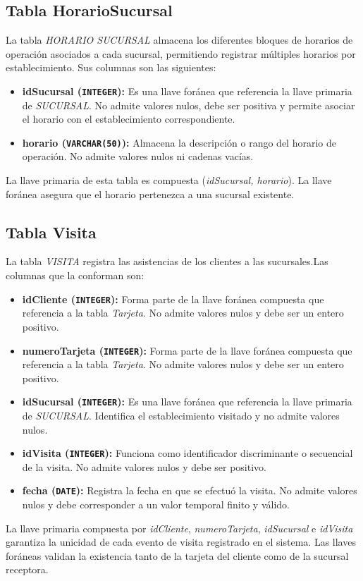 \subsection{Tabla HorarioSucursal} La tabla \textit{HORARIO SUCURSAL} almacena los diferentes bloques de horarios de operación asociados a cada sucursal, permitiendo registrar múltiples horarios por establecimiento. Sus columnas son las siguientes:
\begin{itemize}
    \item \textbf{idSucursal (\texttt{INTEGER}):} Es una llave foránea que referencia la llave primaria de \textit{SUCURSAL}. No admite valores nulos, debe ser positiva y permite asociar el horario con el establecimiento correspondiente.
    \item \textbf{horario (\texttt{VARCHAR(50)}):} Almacena la descripción o rango del horario de operación. No admite valores nulos ni cadenas vacías.
\end{itemize}
La llave primaria de esta tabla es compuesta (\textit{idSucursal, horario}). La llave foránea asegura que el horario pertenezca a una sucursal existente.

\subsection{Tabla Visita}La tabla \textit{VISITA} registra las asistencias de los clientes a las sucursales.Las columnas que la conforman son:
\begin{itemize}
    \item \textbf{idCliente (\texttt{INTEGER}):} Forma parte de la llave foránea compuesta que referencia a la tabla \textit{Tarjeta}. No admite valores nulos y debe ser un entero positivo.
    \item \textbf{numeroTarjeta (\texttt{INTEGER}):} Forma parte de la llave foránea compuesta que referencia a la tabla \textit{Tarjeta}. No admite valores nulos y debe ser un entero positivo.
    \item \textbf{idSucursal (\texttt{INTEGER}):} Es una llave foránea que referencia la llave primaria de \textit{SUCURSAL}. Identifica el establecimiento visitado y no admite valores nulos.
    \item \textbf{idVisita (\texttt{INTEGER}):} Funciona como identificador discriminante o secuencial de la visita. No admite valores nulos y debe ser positivo.
    \item \textbf{fecha (\texttt{DATE}):} Registra la fecha en que se efectuó la visita. No admite valores nulos y debe corresponder a un valor temporal finito y válido.
\end{itemize}
La llave primaria compuesta por \textit{idCliente}, \textit{numeroTarjeta}, \textit{idSucursal} e \textit{idVisita} garantiza la unicidad de cada evento de visita registrado en el sistema. Las llaves foráneas validan la existencia tanto de la tarjeta del cliente como de la sucursal receptora.

